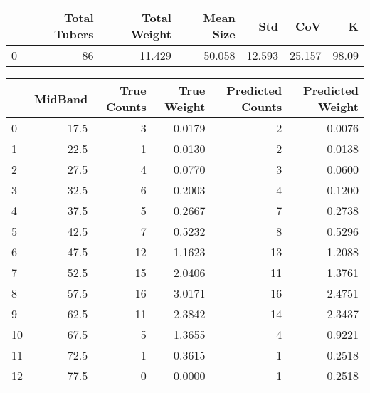 \begin{tabular}{lrrrrrr}
\toprule
{} &  Total Tubers &  Total Weight &  Mean Size &     Std &     CoV &      K \\
\midrule
0 &            86 &        11.429 &     50.058 &  12.593 &  25.157 &  98.09 \\
\bottomrule
\end{tabular}

\begin{tabular}{lrrrrr}
\toprule
{} &  MidBand &  True Counts &  True Weight &  Predicted Counts &  Predicted Weight \\
\midrule
0  &     17.5 &            3 &       0.0179 &                 2 &            0.0076 \\
1  &     22.5 &            1 &       0.0130 &                 2 &            0.0138 \\
2  &     27.5 &            4 &       0.0770 &                 3 &            0.0600 \\
3  &     32.5 &            6 &       0.2003 &                 4 &            0.1200 \\
4  &     37.5 &            5 &       0.2667 &                 7 &            0.2738 \\
5  &     42.5 &            7 &       0.5232 &                 8 &            0.5296 \\
6  &     47.5 &           12 &       1.1623 &                13 &            1.2088 \\
7  &     52.5 &           15 &       2.0406 &                11 &            1.3761 \\
8  &     57.5 &           16 &       3.0171 &                16 &            2.4751 \\
9  &     62.5 &           11 &       2.3842 &                14 &            2.3437 \\
10 &     67.5 &            5 &       1.3655 &                 4 &            0.9221 \\
11 &     72.5 &            1 &       0.3615 &                 1 &            0.2518 \\
12 &     77.5 &            0 &       0.0000 &                 1 &            0.2518 \\
\bottomrule
\end{tabular}

